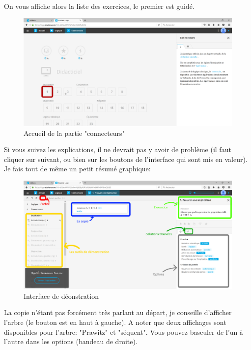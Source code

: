 \documentclass[a4paper]{article}
\begin{document}
On vous affiche alors la liste des exercices, le premier est guidé. 
\begin{figure}[h!]
\begin{center}
\includegraphics[scale=0.1]{img_app4.png}
\end{center}
\caption{Accueil de la partie "connecteurs"}\label{im:connecteurs_accueil}
\end{figure}
\FloatBarrier

Si vous suivez les explications, il ne devrait pas y avoir de problème (il faut cliquer sur suivant, ou bien sur les boutons de l'interface qui sont mis en valeur).
Je fais tout de même un petit résumé graphique:
\begin{figure}[h!]
\begin{center}
\includegraphics[scale=0.1]{img_app5.png}
\end{center}
\caption{Interface de déonstration}\label{im:interface_demo}
\end{figure}
\FloatBarrier

La copie n'étant pas forcément très parlant au départ, je conseille d'afficher l'arbre (le bouton est en haut à gauche). A noter que deux affichages sont disponibles pour l'arbre: "Prawitz" et "séquent". Vous pouvez basculer de l'un à l'autre dans les options (bandeau de droite).
\end{document}
